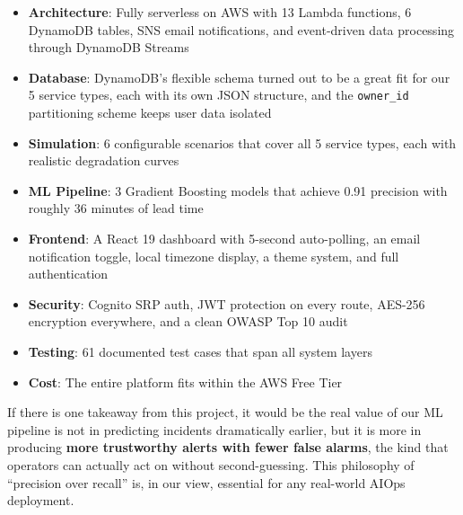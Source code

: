 \documentclass[11pt,a4paper]{article}
\begin{document}
\begin{infobox}
\begin{itemize}[leftmargin=1em, itemsep=2pt]
    \item \textbf{Architecture}: Fully serverless on AWS with 13 Lambda functions, 6 DynamoDB tables, SNS email notifications, and event-driven data processing through DynamoDB Streams
    \item \textbf{Database}: DynamoDB's flexible schema turned out to be a great fit for our 5 service types, each with its own JSON structure, and the \texttt{owner\_id} partitioning scheme keeps user data isolated
    \item \textbf{Simulation}: 6 configurable scenarios that cover all 5 service types, each with realistic degradation curves
    \item \textbf{ML Pipeline}: 3 Gradient Boosting models that achieve 0.91 precision with roughly 36 minutes of lead time
    \item \textbf{Frontend}: A React 19 dashboard with 5-second auto-polling, an email notification toggle, local timezone display, a theme system, and full authentication
    \item \textbf{Security}: Cognito SRP auth, JWT protection on every route, AES-256 encryption everywhere, and a clean OWASP Top 10 audit
    \item \textbf{Testing}: 61 documented test cases that span all system layers
    \item \textbf{Cost}: The entire platform fits within the AWS Free Tier
\end{itemize}
\end{infobox}

If there is one takeaway from this project, it would be the real value of our ML pipeline is not in predicting incidents dramatically earlier, but it is more in producing \textbf{more trustworthy alerts with fewer false alarms}, the kind that operators can actually act on without second-guessing. This philosophy of ``precision over recall'' is, in our view, essential for any real-world AIOps deployment.
\end{document}
